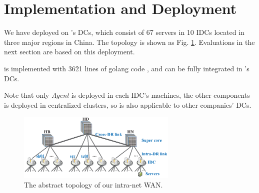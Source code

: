 \section{Implementation and Deployment}
\label{sec:deployment}

We have deployed \name on \company's DCs, which consist of 67 servers in 10 IDCs located in three major regions in China. The topology is shown as Fig. \ref{fig:topology}. Evaluations in the next section are based on this deployment.

\name is implemented with 3621 lines of golang code \cite{golang}, and can be fully integrated in \company's DCs.

%

Note that only \emph{Agent} is deployed in each IDC's machines, the other components is deployed in centralized clusters, so \name is also applicable to other companies' DCs. 	

\begin{figure}[htbp]
  \centering
  \includegraphics[width=3in]{images/Testbed_v2.eps}
  \caption{The abstract topology of our intra-net WAN.}
  \label{fig:topology}
\end{figure}
\vspace{-15pt}


